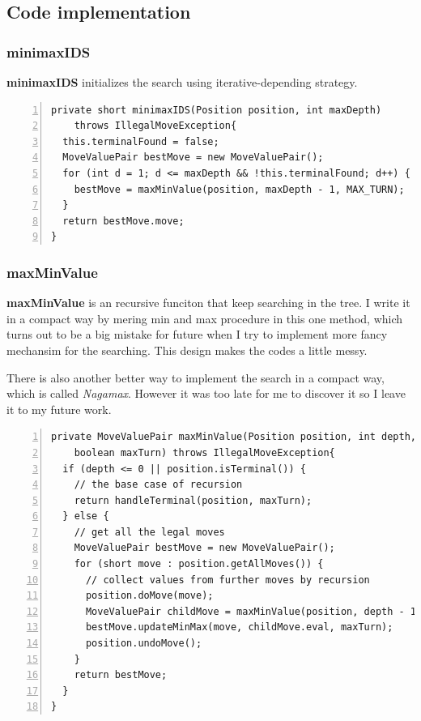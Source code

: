 \documentclass{article}
\begin{document}
\subsection{Code implementation}


\subsubsection{minimaxIDS}

\textbf{minimaxIDS} initializes the search using iterative-depending strategy.


\begin{lstlisting}[numbers=left]
private short minimaxIDS(Position position, int maxDepth) 
    throws IllegalMoveException{
  this.terminalFound = false;
  MoveValuePair bestMove = new MoveValuePair();
  for (int d = 1; d <= maxDepth && !this.terminalFound; d++) {
    bestMove = maxMinValue(position, maxDepth - 1, MAX_TURN);
  }
  return bestMove.move;
}
\end{lstlisting}


\subsubsection{maxMinValue}

\textbf{maxMinValue} is an recursive funciton that keep searching in the tree. I write it in a compact way by mering min and max procedure in this one method, which turns out to be a big mistake for future when I try to implement more fancy mechansim for the searching. This design makes the codes a little messy.

There is also another better way to implement the search in a compact way, which is called \emph{Nagamax}. However it was too late for me to discover it so I leave it to my future work.

\begin{lstlisting}[numbers=left]
private MoveValuePair maxMinValue(Position position, int depth, 
    boolean maxTurn) throws IllegalMoveException{
  if (depth <= 0 || position.isTerminal()) {
    // the base case of recursion
    return handleTerminal(position, maxTurn);
  } else {
    // get all the legal moves
    MoveValuePair bestMove = new MoveValuePair();
    for (short move : position.getAllMoves()) {
      // collect values from further moves by recursion
      position.doMove(move);
      MoveValuePair childMove = maxMinValue(position, depth - 1, !maxTurn);
      bestMove.updateMinMax(move, childMove.eval, maxTurn);
      position.undoMove();
    }
    return bestMove;
  }
}
\end{lstlisting}
\end{document}
